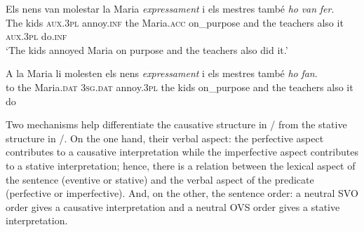 \documentclass[output=paper,colorlinks,citecolor=brown,modfonts,nonflat]{langsci/langscibook}
\begin{document}
\ea%
 \label{ex:royo:3}
 \ea \label{ex:royo:3a}
 \gll Els nens van molestar la Maria \emph{expressament} i els mestres també \emph{ho} \emph{van} \emph{fer}. \\
The kids \textsc{aux.3pl} annoy.\textsc{inf} the Maria.\textsc{acc} on\_purpose     and the teachers also     it  \textsc{aux.3pl} do.\textsc{inf}\\
 \glt ‘The kids annoyed Maria on purpose and the teachers also did it.’

 \ex \label{ex:royo:3b}
 \gll *A la Maria li molesten els nens \emph{expressament} i els mestres també \emph{ho} \emph{fan}.\\
  to the Maria.\textsc{dat} \textsc{3sg.dat} annoy.\textsc{3pl} the kids on\_purpose     and the teachers also    it   do\\
\glt

 \z
 \z

Two mechanisms help differentiate the causative structure in / from the stative structure in /. On the one hand, their verbal aspect: the perfective aspect contributes to a causative interpretation while the imperfective aspect contributes to a stative interpretation; hence, there is a relation between the lexical aspect of the sentence (eventive or stative) and the verbal aspect of the predicate (perfective or imperfective). And, on the other, the sentence order: a neutral SVO order gives a causative interpretation and a neutral OVS order gives a stative interpretation.
\end{document}
